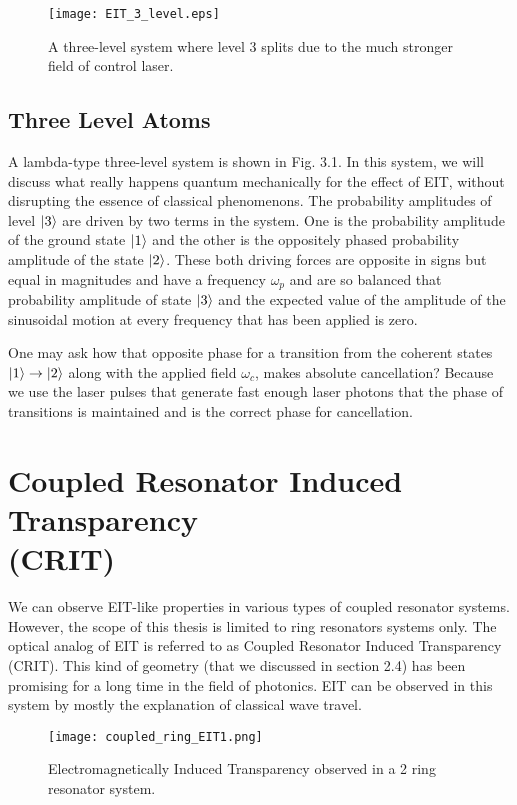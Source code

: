 \begin{figure}[h]
\centering
\texttt{[image: EIT\_3\_level.eps]}
\caption{A three-level system where level 3 splits due to the much stronger field of control laser.}
\end{figure}

\subsection{Three Level Atoms}
A lambda-type three-level system is shown in Fig. 3.1. In this system, we will discuss what really happens quantum mechanically for the effect of EIT, without disrupting the essence of classical phenomenons. The probability amplitudes of level $\ket{3}$ are driven by two terms in the system. One is the probability amplitude of the ground state $\ket{1}$ and the other is the oppositely phased probability amplitude of the state $\ket{2}$. These both driving forces are opposite in signs but equal in magnitudes and have a frequency $\omega_{p}$ and are so balanced that probability amplitude of state $\ket{3}$ and the expected value of the amplitude of the sinusoidal motion at every frequency that has been applied is zero. 


One may ask how that opposite phase for a transition from the coherent states $\ket{1} \to \ket{2}$ along with the applied field $\omega_{c}$, makes absolute cancellation? Because we use the laser pulses that generate fast enough laser photons that the phase of transitions is maintained and is the correct phase for cancellation. 


\section{Coupled Resonator Induced Transparency \\ (CRIT)}
We can observe EIT-like properties in various types of coupled resonator systems. However, the scope of this thesis is limited to ring resonators systems only. The optical analog of EIT is referred to as Coupled Resonator Induced Transparency (CRIT). This kind of geometry (that we discussed in section 2.4) has been promising for a long time in the field of photonics. EIT can be observed in this system by mostly the explanation of classical wave travel.

\begin{figure}[h]
\centering
\texttt{[image: coupled\_ring\_EIT1.png]}
\caption{Electromagnetically Induced Transparency observed in a 2 ring resonator system.}
\end{figure}


